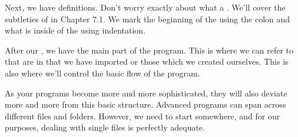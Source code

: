 Next, we have  definitions. Don't worry exactly about what a . We'll cover the subtleties of  in Chapter 7.1. We mark the beginning of the  using the colon and what is inside of the  using indentation.\par
After our , we have the main part of the program. This is where we can refer to  that are in  that we have imported or those which we created ourselves. This is also where we'll control the basic flow of the program.\par
As your programs become more and more sophisticated, they will also deviate more and more from this basic structure. Advanced programs can span across different files and folders. However, we need to start somewhere, and for our purposes, dealing with single files is perfectly adequate.\par
